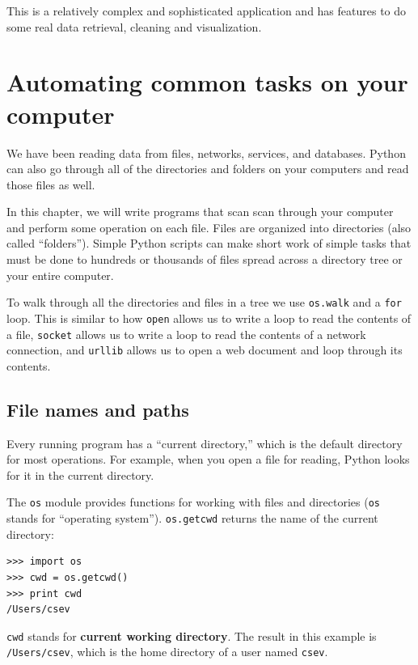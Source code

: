 \documentclass[11pt]{book}
\begin{document}
This is a relatively complex and sophisticated application and 
has features to do some real data retrieval, cleaning and visualization.

\chapter{Automating common tasks on your computer}

We have been reading data from files, networks, services,
and databases.   Python can also go through all of the 
directories and folders on your computers and read those files
as well.

In this chapter, we will write programs that scan 
scan through your computer and 
perform some operation on each file.  
Files are organized into directories (also called ``folders'').
Simple Python scripts
can make short work of simple tasks that must be done to 
hundreds or thousands of files
spread across a directory tree or your entire computer.

To walk through all the directories and files in a tree we use 
{\tt os.walk} and a {\tt for} loop.  This is similar to how 
{\tt open} allows us to write a loop to read the contents of a file,
{\tt socket} allows us to write a loop to read the contents of a network connection, and
{\tt urllib} allows us to open a web document and loop through its contents.

\section{File names and paths}
\label{paths}


Every running program has a ``current directory,'' which is the
default directory for most operations.  
For example, when you open a file for reading, Python looks for it in the
current directory.


The {\tt os} module provides functions for working with files and
directories ({\tt os} stands for ``operating system'').  {\tt os.getcwd}
returns the name of the current directory:


\beforeverb
\begin{verbatim}
>>> import os
>>> cwd = os.getcwd()
>>> print cwd
/Users/csev
\end{verbatim}
\afterverb
%
{\tt cwd} stands for {\bf current working directory}.  The result in
this example is {\tt /Users/csev}, which is the home directory of a
user named {\tt csev}.
\end{document}
